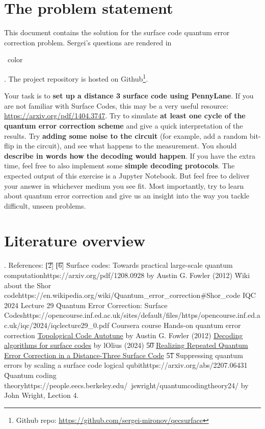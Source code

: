 \section{The problem statement}

This document contains the solution for the surface code quantum error correction problem. Sergei's
questions are rendered in \begin{\QuestionColor}\QuestionColorName\ color\end{\QuestionColor}. The
project repository is hosted on
Github\footnote{Github repo: \url{https://github.com/sergei-mironov/qecsurface}}.

\vsp

Your task is to \textbf{set up a distance 3 surface code using PennyLane}. If you are not familiar
with Surface Codes, this may be a very useful resource: \url{https://arxiv.org/pdf/1404.3747}. Try
to simulate \textbf{at least one cycle of the quantum error correction scheme} and give a quick
interpretation of the results. Try \textbf{adding some noise to the circuit} (for example, add a
random bit-flip in the circuit), and see what happens to the measurement. You should
\textbf{describe in words how the decoding would happen}. If you have the extra time, feel free to
also implement some \textbf{simple decoding protocols}. The expected output of this exercise is a
Jupyter Notebook. But feel free to deliver your answer in whichever medium you see fit. Most
importantly, try to learn about quantum error correction and give us an insight into the way you
tackle difficult, unseen problems.


\section{Literature overview}

\ls {}. References:
    \ls \t{[2]} 
    \li \t{[6]} \u{Surface codes: Towards practical large-scale quantum computation}{https://arxiv.org/pdf/1208.0928}
        by Austin G. Fowler (2012)
    \le
\li \u{Wiki about the Shor code}{https://en.wikipedia.org/wiki/Quantum_error_correction\#Shor_code}
\li IQC 2024 Lecture 29 \u{Quantum Error Correction: Surface Codes}{https://opencourse.inf.ed.ac.uk/sites/default/files/https/opencourse.inf.ed.ac.uk/iqc/2024/iqclecture29_0.pdf}
\li Coursera course Hands-on quantum error correction
    \ls \href{https://journals.aps.org/prx/pdf/10.1103/PhysRevX.2.041003}{Topological Code Autotune}
        by Austin G. Fowler (2012)
    \le
\li \href{https://arxiv.org/abs/2307.14989}{Decoding algorithms for surface codes} by lOlius (2024)
    \ls \t{50} \href{https://arxiv.org/abs/2112.03708}{Realizing Repeated Quantum Error Correction in a Distance-Three Surface Code}
    \li \t{51} \u{Suppressing quantum errors by scaling a surface code logical qubit}{https://arxiv.org/abs/2207.06431}
    \le
\li {}
\li \u{Quantum coding theory}{https://people.eecs.berkeley.edu/~jswright/quantumcodingtheory24/}
    by John Wright, Lection 4.
\le


